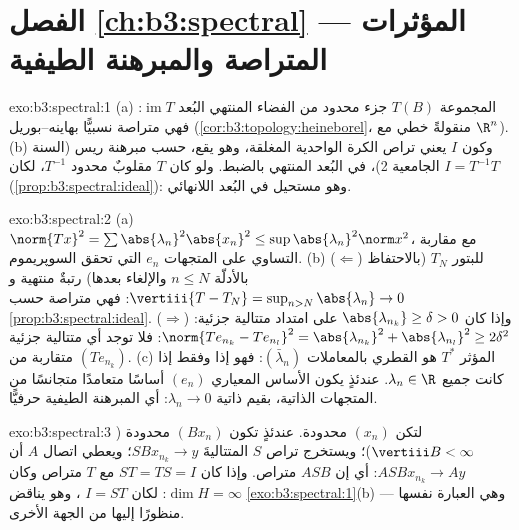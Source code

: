 \section*{الفصل \ref{ch:b3:spectral} --- المؤثرات المتراصة
والمبرهنة الطيفية}

\begin{solution}{exo:b3:spectral:1}
(a) المجموعة $T(B)$ جزء محدود من الفضاء المنتهي البُعد $\operatorname{im}T$:
فهي متراصة نسبيًّا بهاينه--بوريل (\cref{cor:b3:topology:heineborel}، منقولةً  خطي مع $\R^n$).
(b) وكون $I$  يعني تراص الكرة الواحدية المغلقة، وهو
يقع، حسب مبرهنة ريس (السنة الجامعية 2)، في البُعد المنتهي
بالضبط. ولو كان  $T$ مقلوبٌ محدود $T^{-1}$، لكان
$I = T^{-1}T$  (\cref{prop:b3:spectral:ideal}): وهو مستحيل في البُعد
اللانهائي.
\end{solution}

\begin{solution}{exo:b3:spectral:2}
(a) $\norm{Tx}^2 = \sum\abs{\lambda_n}^2\abs{x_n}^2 \leq
\sup\abs{\lambda_n}^2\norm x^2$، مع مقاربة التساوي على المتجهات $e_n$ التي تحقق
السوپريموم.
(b) ($\Leftarrow$) للبتور $T_N$ (بالاحتفاظ بالأدلّة $n \leq N$
والإلغاء بعدها) رتبةٌ منتهية و $\vertiii{T - T_N} =
\sup_{n>N}\abs{\lambda_n} \to 0$: فهي متراصة حسب
\cref{prop:b3:spectral:ideal}. ($\Rightarrow$) وإذا كان $\abs{\lambda_{n_k}} \geq \delta > 0$ على امتداد متتالية
جزئية: $\norm{Te_{n_k} - Te_{n_l}}^2 = \abs{\lambda_{n_k}}^2 +
\abs{\lambda_{n_l}}^2 \geq 2\delta^2$: فلا توجد أي متتالية جزئية متقاربة من
$(Te_{n_k})$.
(c) المؤثر $T^*$ هو القطري بالمعاملات $(\bar\lambda_n)$: فهو  إذا
وفقط إذا كانت جميع $\lambda_n \in \R$. عندئذٍ يكون الأساس المعياري $(e_n)$
أساسًا متعامدًا متجانسًا من المتجهات الذاتية، بقيم ذاتية
$\lambda_n \to
0$: أي المبرهنة الطيفية حرفيًّا.
\end{solution}

\begin{solution}{exo:b3:spectral:3}
لتكن $(x_n)$ محدودة. عندئذٍ تكون $(Bx_n)$ محدودة ($\vertiii B < \infty$)؛
ويستخرج تراص $S$ المتتاليةَ $SBx_{n_k} \to y$؛ ويعطي اتصال $A$ أن $ASBx_{n_k} \to
Ay$:
أي إن $ASB$ متراص. وإذا كان $ST = TS = I$ مع $T$ متراص وكان
$\dim H = \infty$: لكان $I = ST$ ، وهو يناقض \cref{exo:b3:spectral:1}(b) ---
وهي العبارة نفسها منظورًا إليها من الجهة الأخرى.
\end{solution}

